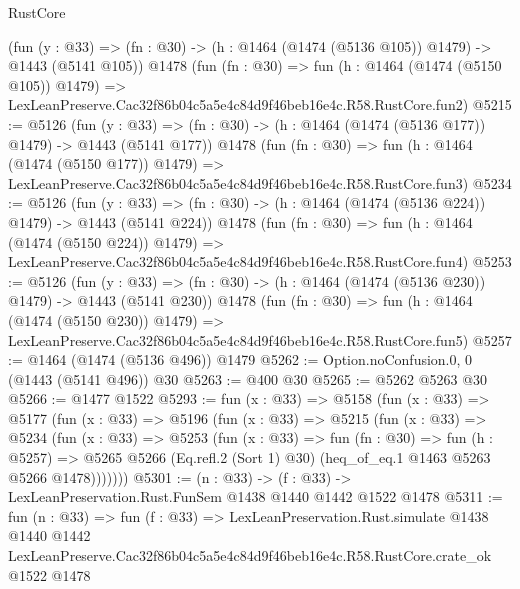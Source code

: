 \begin{lexlean}{RustCore}
\begin{coremodule}
    (fun (y : @33) => (fn : @30) -> (h : @1464 (@1474 (@5136 @105)) @1479) -> @1443 (@5141 @105))
    @1478
    (fun (fn : @30) =>
    fun (h : @1464 (@1474 (@5150 @105)) @1479) =>
    LexLeanPreserve.Cac32f86b04c5a5e4c84d9f46beb16e4c.R58.RustCore.fun2)
@5215 := @5126
    (fun (y : @33) => (fn : @30) -> (h : @1464 (@1474 (@5136 @177)) @1479) -> @1443 (@5141 @177))
    @1478
    (fun (fn : @30) =>
    fun (h : @1464 (@1474 (@5150 @177)) @1479) =>
    LexLeanPreserve.Cac32f86b04c5a5e4c84d9f46beb16e4c.R58.RustCore.fun3)
@5234 := @5126
    (fun (y : @33) => (fn : @30) -> (h : @1464 (@1474 (@5136 @224)) @1479) -> @1443 (@5141 @224))
    @1478
    (fun (fn : @30) =>
    fun (h : @1464 (@1474 (@5150 @224)) @1479) =>
    LexLeanPreserve.Cac32f86b04c5a5e4c84d9f46beb16e4c.R58.RustCore.fun4)
@5253 := @5126
    (fun (y : @33) => (fn : @30) -> (h : @1464 (@1474 (@5136 @230)) @1479) -> @1443 (@5141 @230))
    @1478
    (fun (fn : @30) =>
    fun (h : @1464 (@1474 (@5150 @230)) @1479) =>
    LexLeanPreserve.Cac32f86b04c5a5e4c84d9f46beb16e4c.R58.RustCore.fun5)
@5257 := @1464 (@1474 (@5136 @496)) @1479
@5262 := Option.noConfusion.{0, 0} (@1443 (@5141 @496)) @30
@5263 := @400 @30
@5265 := @5262 @5263 @30
@5266 := @1477 @1522
@5293 := fun (x : @33) =>
  @5158
    (fun (x : @33) =>
    @5177
      (fun (x : @33) =>
      @5196
        (fun (x : @33) =>
        @5215
          (fun (x : @33) =>
          @5234
            (fun (x : @33) =>
            @5253
              (fun (x : @33) =>
              fun (fn : @30) =>
              fun (h : @5257) =>
              @5265 @5266 (Eq.refl.{2} (Sort 1) @30) (heq_of_eq.{1} @1463 @5263 @5266 @1478)))))))
@5301 := (n : @33) -> (f : @33) -> LexLeanPreservation.Rust.FunSem @1438 @1440 @1442 @1522 @1478
@5311 := fun (n : @33) =>
  fun (f : @33) =>
  LexLeanPreservation.Rust.simulate
    @1438
    @1440
    @1442
    LexLeanPreserve.Cac32f86b04c5a5e4c84d9f46beb16e4c.R58.RustCore.crate_ok
    @1522
    @1478
\end{coremodule}
\end{lexlean}
